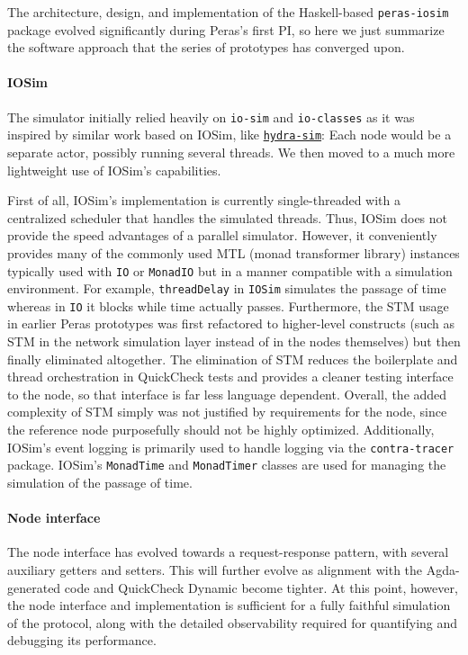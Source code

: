 \documentclass[10pt]{article}
\begin{document}
The architecture, design, and implementation of the Haskell-based
\texttt{peras-iosim} package evolved significantly during Peras's first
PI, so here we just summarize the software approach that the series of
prototypes has converged upon.

\paragraph{IOSim}\label{iosim}

The simulator initially relied heavily on \texttt{io-sim} and
\texttt{io-classes} as it was inspired by similar work based on IOSim,
like \href{https://github.com/input-output-hk/hydra-sim}{\color{blue}\texttt{hydra-sim}}:
Each node would be a separate actor, possibly running several threads.
We then moved to a much more lightweight use of IOSim's capabilities.

First of all, IOSim's implementation is currently single-threaded with a
centralized scheduler that handles the simulated threads. Thus, IOSim
does not provide the speed advantages of a parallel simulator. However,
it conveniently provides many of the commonly used MTL (monad
transformer library) instances typically used with \texttt{IO} or
\texttt{MonadIO} but in a manner compatible with a simulation
environment. For example, \texttt{threadDelay} in \texttt{IOSim}
simulates the passage of time whereas in \texttt{IO} it blocks while
time actually passes. Furthermore, the STM usage in earlier Peras
prototypes was first refactored to higher-level constructs (such as STM
in the network simulation layer instead of in the nodes themselves) but
then finally eliminated altogether. The elimination of STM reduces the
boilerplate and thread orchestration in QuickCheck tests and provides a
cleaner testing interface to the node, so that interface is far less
language dependent. Overall, the added complexity of STM simply was not
justified by requirements for the node, since the reference node
purposefully should not be highly optimized. Additionally, IOSim's event
logging is primarily used to handle logging via the
\texttt{contra-tracer} package. IOSim's \texttt{MonadTime} and
\texttt{MonadTimer} classes are used for managing the simulation of the
passage of time.

\paragraph{Node interface}\label{node-interface}

The node interface has evolved towards a request-response pattern, with
several auxiliary getters and setters. This will further evolve as
alignment with the Agda-generated code and QuickCheck Dynamic become
tighter. At this point, however, the node interface and implementation
is sufficient for a fully faithful simulation of the protocol, along
with the detailed observability required for quantifying and debugging
its performance.
\end{document}

